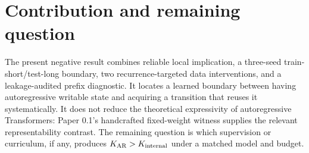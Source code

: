 \documentclass[10pt]{article}
\begin{document}
\section{Contribution and remaining question}
The present negative result combines reliable local implication, a three-seed train-short/test-long boundary, two recurrence-targeted data interventions, and a leakage-audited prefix diagnostic. It locates a learned boundary between having autoregressive writable state and acquiring a transition that reuses it systematically. It does not reduce the theoretical expressivity of autoregressive Transformers: Paper 0.1's handcrafted fixed-weight witness supplies the relevant representability contrast. The remaining question is which supervision or curriculum, if any, produces $K_{\rm AR}>K_{\rm internal}$ under a matched model and budget.
\end{document}
